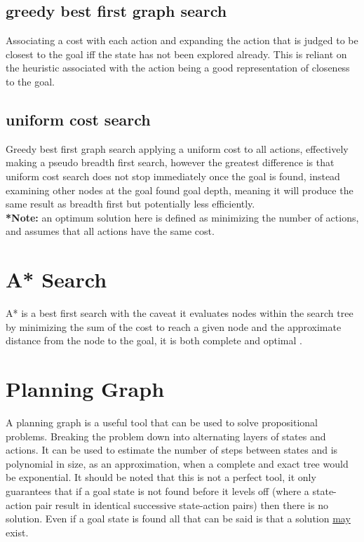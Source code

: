 \documentclass[11pt]{article}
\begin{document}
\subsection{greedy best first graph search}
Associating a cost with each action and expanding the action that is judged to be closest to the goal iff the state has not been explored already. This is reliant on the heuristic associated with the action being a good representation of closeness to the goal.

\subsection{uniform cost search}
Greedy best first graph search applying a uniform cost to all actions, effectively making a pseudo breadth first search, however the greatest difference is that uniform cost search does not stop immediately once the goal is found, instead examining other nodes at the goal found goal depth\cite{russell2005ai}, meaning it will produce the same result as breadth first but potentially less efficiently.\\

\textbf{*Note:} an optimum solution here is defined as minimizing the number of actions, and assumes that all actions have the same cost.

\section{A* Search}
A* is a best first search with the caveat it evaluates nodes within the search tree by minimizing the sum of the cost to reach a given node and the approximate distance from the node to the goal, it is both complete and optimal \cite{russell2005ai}.


\section{Planning Graph}
A planning graph is a useful tool that can be used to solve propositional problems. Breaking the problem down into alternating layers of states and actions. It can be used to estimate the number of steps between states and is polynomial in size, as an approximation, when a complete and exact tree would be exponential\cite{russell2005ai}. It should be noted that this is not a perfect tool, it only guarantees that if a goal state is not found before it levels off (where a state-action pair result in identical successive state-action pairs) then there is no solution. Even if a goal state is found all that can be said is that a solution \underline{may} exist.
\end{document}
